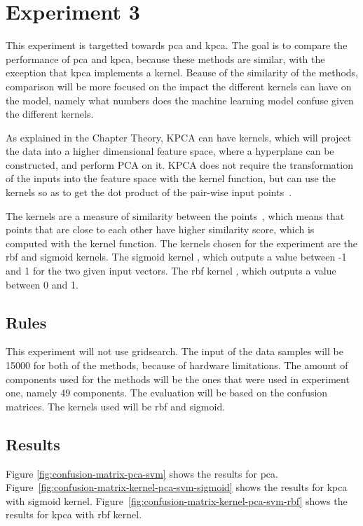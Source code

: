 \section{Experiment 3}\label{sec:experiment-3}
This experiment is targetted towards \gls{pca} and \gls{kpca}. The goal is to compare the performance of \gls{pca} and \gls{kpca}, because these methods are similar, with the exception that \gls{kpca} implements a kernel. Beause of the similarity of the methods, comparison will be more focused on the impact the different kernels can have on the model, namely what numbers does the machine learning model confuse given the different kernels.


As explained in the Chapter Theory, KPCA can have kernels, which will project the data into a higher dimensional feature space, where a hyperplane can be constructed, and perform PCA on it. KPCA does not require the transformation of the inputs into the feature space with the kernel function, but can use the kernels so as to get the dot product of the pair-wise input points~\cite{kpca-book}.


The kernels are a measure of similarity between the points~\cite{scikit-learn}, which means that points that are close to each other have higher similarity score, which is computed with the kernel function. The kernels chosen for the experiment are the \gls{rbf} and sigmoid kernels. The sigmoid kernel , which outputs a value between -1 and 1 for the two given input vectors. The \gls{rbf} kernel , which outputs a value between 0 and 1.


\subsection{Rules}
This experiment will not use gridsearch. The input of the data samples will be 15000 for both of the methods, because of hardware limitations. The amount of components used for the methods will be the ones that were used in experiment one, namely 49 components. The evaluation will be based on the confusion matrices. The kernels used will be \gls{rbf} and sigmoid.
\subsection{Results}
Figure \ref{fig:confusion-matrix-pca-svm} shows the results for \gls{pca}.
Figure~\ref{fig:confusion-matrix-kernel-pca-svm-sigmoid} shows the results for \gls{kpca} with sigmoid kernel.
Figure~\ref{fig:confusion-matrix-kernel-pca-svm-rbf} shows the results for \gls{kpca} with rbf kernel.


